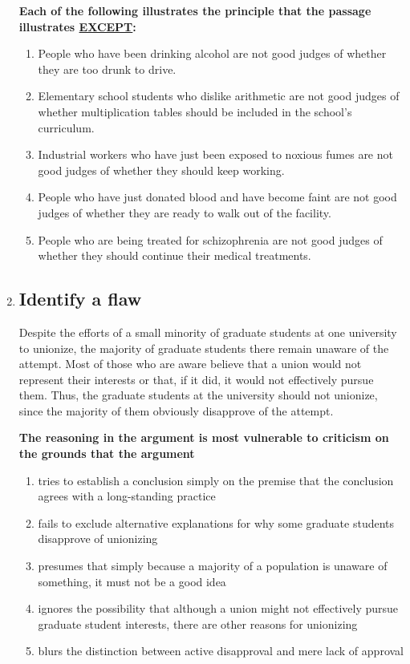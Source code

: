 \documentclass[9pt]{article}
\begin{document}
\begin{multicols}{3}
\begin{enumerate}
 

\noindent
\textbf{Each of the following illustrates the principle that the passage illustrates \underline{EXCEPT}:}

\begin{enumerate}[label=(\alph*)]
    \item People who have been drinking alcohol are not good judges of whether they are too drunk to drive.
    \item Elementary school students who dislike arithmetic are not good judges of whether multiplication tables should be included in the school's curriculum.
    \item Industrial workers who have just been exposed to noxious fumes are not good judges of whether they should keep working.
    \item People who have just donated blood and have become faint are not good judges of whether they are ready to walk out of the facility.
    \item People who are being treated for schizophrenia are not good judges of whether they should continue their medical treatments.
\end{enumerate}


\item
\subsection*{Identify a flaw}
\noindent
Despite the efforts of a small minority of graduate students at one university to unionize, the majority of graduate students there remain unaware of the attempt. Most of those who are aware believe that a union would not represent their interests or that, if it did, it would not effectively pursue them. Thus, the graduate students at the university should not unionize, since the majority of them obviously disapprove of the attempt.

 

\noindent
\textbf{The reasoning in the argument is most vulnerable to criticism on the grounds that the argument}

\begin{enumerate}[label=(\alph*)]
    \item tries to establish a conclusion simply on the premise that the conclusion agrees with a long-standing practice
    \item fails to exclude alternative explanations for why some graduate students disapprove of unionizing
    \item presumes that simply because a majority of a population is unaware of something, it must not be a good idea
    \item ignores the possibility that although a union might not effectively pursue graduate student interests, there are other reasons for unionizing
    \item blurs the distinction between active disapproval and mere lack of approval
\end{enumerate}


\end{enumerate}
\end{multicols}
\end{document}

